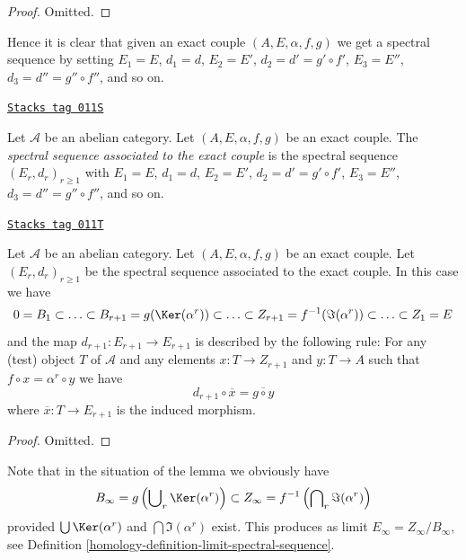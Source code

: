\begin{proof}
Omitted.
\end{proof}

Hence it is clear that given an exact couple $(A, E, \alpha, f, g)$
we get a spectral sequence by setting $E_1 = E$, $d_1 = d$,
$E_2 = E'$, $d_2 = d' = g' \circ f'$, $E_3 = E''$, $d_3 = d'' = g'' \circ f''$,
and so on.

\begin{definition}
\label{homology-definition-spectral-sequence-associated-exact-couple}
\href{https://stacks.math.columbia.edu/tag/011S}{\texttt{Stacks tag 011S}}

Let $\mathcal{A}$ be an abelian category.
Let $(A, E, \alpha, f, g)$ be an exact couple.
The {\it spectral sequence associated to the exact couple}
is the spectral sequence $(E_r, d_r)_{r \geq 1}$ with
$E_1 = E$, $d_1 = d$, $E_2 = E'$, $d_2 = d' = g' \circ f'$,
$E_3 = E''$, $d_3 = d'' = g'' \circ f''$,
and so on.
\end{definition}

\begin{lemma}
\label{homology-lemma-spectral-sequence-associated-exact-couple}
\href{https://stacks.math.columbia.edu/tag/011T}{\texttt{Stacks tag 011T}}

Let $\mathcal{A}$ be an abelian category.
Let $(A, E, \alpha, f, g)$ be an exact couple.
Let $(E_r, d_r)_{r \geq 1}$ be the spectral sequence
associated to the exact couple.
In this case we have
$$
0 = B_1 \subset \ldots \subset
B_{r + 1} = g(\Ker(\alpha^r))
\subset \ldots \subset
Z_{r + 1} = f^{-1}(\Im(\alpha^r))
\subset \ldots \subset Z_1 = E
$$
and the map $d_{r + 1} : E_{r + 1} \to E_{r + 1}$
is described by the following rule:
For any (test) object $T$ of $\mathcal{A}$ and any elements
$x : T \to Z_{r + 1}$ and $y : T \to A$ such that
$f \circ x = \alpha^r \circ y$ we have
$$
d_{r + 1} \circ \overline{x} = \overline{g \circ y}
$$
where $\overline{x} : T \to E_{r + 1}$ is the
induced morphism.
\end{lemma}

\begin{proof}
Omitted.
\end{proof}

Note that in the situation of the lemma we obviously have
$$
B_\infty = g\left(\bigcup\nolimits_r \Ker(\alpha^r)\right)
\subset
Z_\infty = f^{-1}\left(\bigcap\nolimits_r \Im(\alpha^r)\right)
$$
provided $\bigcup \Ker(\alpha^r)$ and $\bigcap \Im(\alpha^r)$ exist.
This produces as limit $E_\infty = Z_\infty / B_\infty$, see
Definition \ref{homology-definition-limit-spectral-sequence}.

